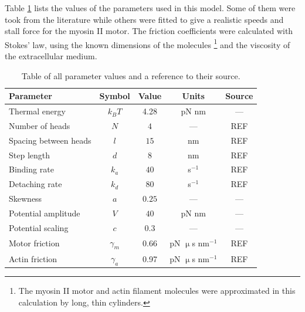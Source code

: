 \documentclass[aps,pre,twocolumn,showpacs,showkeys,a4paper]{revtex4}
\begin{document}
Table \ref{Tab: Parameters} lists the values of the parameters used in this model. 
Some of them were took from the literature while others were fitted to give a realistic speeds and stall force for the myosin II motor. 
The friction coefficients were calculated with Stokes' law, using the known dimensions of the molecules \footnote{The myosin II motor and actin filament molecules were approximated in this calculation by long, thin cylinders.} and the viscosity of the extracellular medium.
\begin{table}[t]
\centering
\begin{tabular}{lcccc}
Parameter & Symbol & Value & Units & Source\\
\hline\hline
Thermal energy & $k_B T$ & 4.28 & pN nm & --- \\
Number of heads & $N$ & $4$ & --- & REF\\
Spacing between heads & $l$ & $15$ & nm & REF\\
Step length & $d$ & $8$ & nm & REF\\
Binding rate & $k_{a}$ & $40$ & s$^{-1}$ & REF\\
Detaching rate & $k_{d}$ & $80$ & s$^{-1}$ & REF\\
Skewness & $a$ & $0.25$ & --- & ---\\
Potential amplitude & $V$ & $40$ & pN nm & ---\\
Potential scaling & $c$ & $0.3$ & --- & ---\\
Motor friction & $\gamma_{m}$ & 0.66 & pN $\upmu$s nm$^{-1}$ & REF\\
Actin friction & $\gamma_{a}$ & 0.97 & pN $\upmu$s nm$^{-1}$ & REF\\
\end{tabular}
\caption{Table of all parameter values and a reference to their source.}
\label{Tab: Parameters}
\end{table}
\end{document}
